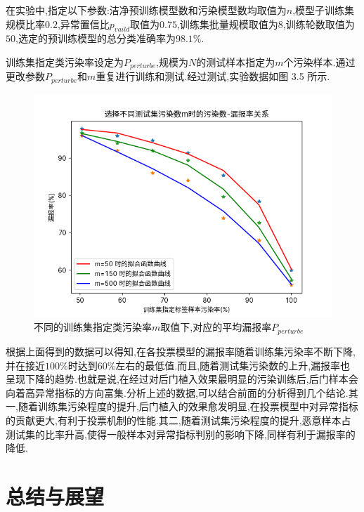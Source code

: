 在实验中,指定以下参数:洁净预训练模型数和污染模型数均取值为$n$,模型子训练集规模比率$0.2$,异常置信比$p_{vaild}$取值为$0.75$,训练集批量规模取值为$8$,训练轮数取值为$50$,选定的预训练模型的总分类准确率为$98.1\%$.

训练集指定类污染率设定为$P_{perturbe}$,规模为$N$的测试样本指定为$m$个污染样本.通过更改参数$P_{perturbe}$和$m$重复进行训练和测试.经过测试,实验数据如图 3.5 所示.
\begin{figure}[H]
	\centering
	\includegraphics[scale=0.7]{Figures/tutu.png}
	\caption{不同的训练集指定类污染率$m$取值下,对应的平均漏报率$P_{perturbe}$}
\end{figure}

根据上面得到的数据可以得知,在各投票模型的漏报率随着训练集污染率不断下降,并在接近$100\%$时达到$60\%$左右的最低值.而且,随着测试集污染数的上升,漏报率也呈现下降的趋势.也就是说,在经过对后门植入效果最明显的污染训练后,后门样本会向着高异常指标的方向富集.分析上述的数据,可以结合前面的分析得到几个结论.其一,随着训练集污染程度的提升,后门植入的效果愈发明显,在投票模型中对异常指标的贡献更大,有利于投票机制的性能.其二,随着测试集污染程度的提升,恶意样本占测试集的比率升高,使得一般样本对异常指标判别的影响下降,同样有利于漏报率的降低.

\chapter{总结与展望}

